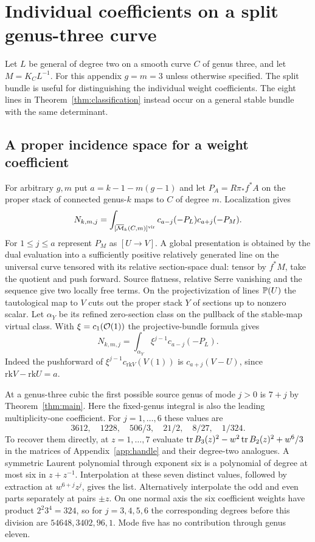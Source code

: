\section{Individual coefficients on a split genus-three curve}\label{app:split}
Let $L$ be general of degree two on a smooth curve $C$ of genus three,
and let $M=K_C L^{-1}$. For this appendix $g=m=3$ unless otherwise
specified. The split bundle is useful for distinguishing the
individual weight coefficients. The eight lines in
Theorem~\ref{thm:classification} instead occur on a general stable
bundle with the same determinant.

\subsection{A proper incidence space for a weight coefficient}
For arbitrary $g,m$ put $a=k-1-m(g-1)$ and let $P_A=R\pi_*f^*A$ on
the proper stack of connected genus-$k$ maps to $C$ of degree $m$.
Localization gives
\[
 N_{k,m,j}=\int_{[\overline{\mathcal M}_k(C,m)]^{\rm vir}}
           c_{a-j}(-P_L)c_{a+j}(-P_M).
\]
For $1\le j\le a$ represent $P_M$ as $[U\to V]$. A global
presentation is obtained by the dual evaluation into a sufficiently
positive relatively generated line on the universal curve tensored
with its relative section-space dual: tensor by $f^*M$, take the
quotient and push forward. Source flatness, relative Serre vanishing
and the sequence give two locally free terms. On the projectivization
of lines $\mathbb P(U)$ the tautological map to $V$ cuts out the proper
stack $Y$ of sections up to nonzero scalar. Let $\alpha_Y$ be its
refined zero-section class on the pullback of the stable-map virtual
class. With $\xi=c_1(\mathcal O(1))$ the projective-bundle formula gives
\[
 N_{k,m,j}=\int_{\alpha_Y}\xi^{j-1}c_{a-j}(-P_L).
\]
Indeed the pushforward of $\xi^{j-1}c_{\mathrm{rk}V}(V(1))$
is $c_{a+j}(V-U)$, since $\mathrm{rk}V-\mathrm{rk}U=a$.

At a genus-three cubic the first possible source genus of mode
$j>0$ is $7+j$ by Theorem~\ref{thm:main}. Here the fixed-genus
integral is also the leading multiplicity-one coefficient. For
$j=1,\ldots,6$ these values are
\[
 3612,\quad 1228,\quad 506/3,\quad 21/2,\quad 8/27,\quad 1/324 .
\]
To recover them directly, at $z=1,\ldots,7$ evaluate
$\operatorname{tr} B_3(z)^2-w^2\operatorname{tr} B_2(z)^2+w^6/3$ in the matrices of
Appendix~\ref{app:handle} and their degree-two analogues. A symmetric
Laurent polynomial through exponent six is a polynomial of degree at
most six in $z+z^{-1}$. Interpolation at these seven distinct values,
followed by extraction at $w^{6+j}z^j$, gives the list. Alternatively
interpolate the odd and even parts separately at pairs $\pm z$.
On one normal axis the six coefficient weights have product
$2^2 3^4=324$, so for $j=3,4,5,6$ the corresponding degrees before
this division are $54648,3402,96,1$. Mode five has no contribution
through genus eleven.

